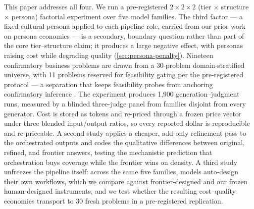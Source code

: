 \documentclass[12pt,a4paper]{article}
\begin{document}
This paper addresses all four. We run a pre-registered $2 \times 2 \times 2$
(tier $\times$ structure $\times$ persona) factorial experiment over five model
families. The third factor --- a fixed cultural persona applied to each pipeline role,
carried from our prior work on persona economics \citep{Hariri2026b} --- is a
secondary, boundary question rather than part of the core tier--structure claim;
it produces a large negative effect, with personas raising cost while degrading
quality (\cref{sec:persona-penalty}). Nineteen confirmatory business problems are drawn from a 30-problem
domain-stratified universe, with 11 problems reserved for feasibility gating per
the pre-registered protocol --- a separation that keeps feasibility probes from
anchoring confirmatory inference \citep{AlbersLakens2018}. The experiment
produces 1{,}900 generation--judgment runs, measured by a blinded three-judge
panel from families disjoint from every generator. Cost is stored as tokens and
re-priced through a frozen price vector under three blended input/output ratios,
so every reported dollar is reproducible and re-priceable. A second study applies
a cheaper, add-only refinement pass to the orchestrated outputs and codes the
qualitative differences between original, refined, and frontier answers, testing
the mechanistic prediction that orchestration buys coverage while the frontier
wins on density. A third study unfreezes the pipeline itself: across the same
five families, models auto-design their own workflows, which we compare against
frontier-designed and our frozen human-designed instruments, and we test whether
the resulting cost--quality economics transport to 30 fresh problems in a
pre-registered replication.
\end{document}

